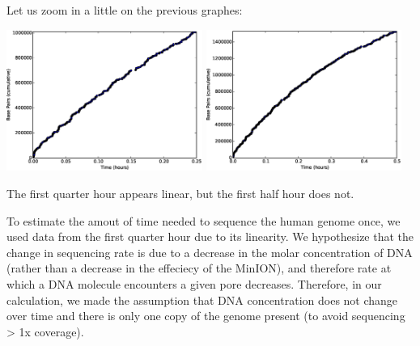

Let us zoom in a little on the previous graphes: 


\includegraphics[width=0.48\textwidth]{q4qh}
\includegraphics[width=0.48\textwidth]{q4hh}

The first quarter hour appears linear, but the first half hour does not.

To estimate the amout of time needed to sequence the human genome once, we used data from the first quarter hour due to its linearity.  We hypothesize that the change in sequencing rate is due to a decrease in the molar concentration of DNA (rather than a decrease in the effeciecy of the MinION), and therefore rate at which a DNA molecule encounters a given pore decreases.  Therefore, in our calculation, we made the assumption that DNA concentration does not change over time and there is only one copy of the genome present (to avoid sequencing > 1x coverage). 

